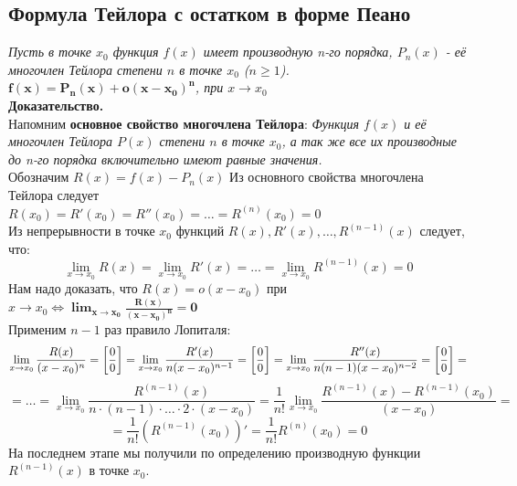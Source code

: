 \newpage
{}
\subsection{Формула Тейлора с остатком в форме Пеано}
\textit{Пусть в точке $x_0$ функция $f(x)$ имеет производную n-го порядка, $P_n(x)$ - её многочлен Тейлора степени $n$ в точке $x_0$ ($n \geq 1$). $\mathbf{f(x) = P_n(x) + o(x - x_0)^{n}}$, при $x \rightarrow x_0$} \\
\textbf{Доказательство.} \\
Напомним \textbf{основное свойство многочлена Тейлора}: \textit{Функция $f(x)$ и её многочлен Тейлора $P(x)$ степени $n$ в точке $x_0$, а так же все их производные до n-го порядка включительно имеют равные значения.} \\
Обозначим $R(x) = f(x) - P_n(x)$ 
Из основного свойства многочлена Тейлора следует \\
$R(x_0) = R'(x_0) = R''(x_0) = \dots = R^{(n)}(x_0) = 0$ \\
Из непрерывности в точке $x_0$ функций $R(x), R'(x), \dots, R^{(n-1)}(x)$ следует, что: 
$$\lim_{x \to x_0} R(x) = \lim_{x \to x_0} R'(x) = \dots = \lim_{x \to x_0} R^{(n-1)}(x) = 0$$
Нам надо доказать, что 
$R(x) = o(x-x_0)$ при $x \rightarrow x_0 \Longleftrightarrow \mathbf{\lim_{x \to x_0} \frac{R(x)}{(x-x_0)^{n}} = 0}$ \\
Применим $n-1$ раз правило Лопиталя: 
$$\lim_{x \to x_0} \frac{R(x)}{(x-x_0)^n} = \left[ {0\over0} \right] = \lim_{x \to x_0} \frac{R'(x)}{n(x-x_0)^{n-1}} = \left[ {0\over0} \right] = \lim_{x \to x_0} \frac{R''(x)}{n(n-1)(x-x_0)^{n-2}} = \left[ {0\over0} \right] =$$
$$= \dots = \lim_{x \to x_0} \frac{R^{(n-1)}(x)}{n\cdot(n-1)\cdot \dots \cdot 2 \cdot (x-x_0)} = \frac{1}{n!} \lim_{x \to x_0} \frac{R^{(n-1)}(x) - R^{(n-1)}(x_0)}{(x-x_0)} = $$
$$=\frac{1}{n!}(R^{(n-1)}(x_0))' = \frac{1}{n!}R^{(n)}(x_0) = 0$$
На последнем этапе мы получили по определению производную функции $R^{(n-1)}(x)$ в точке $x_0$. \qedsymbol
\newpage
{}

